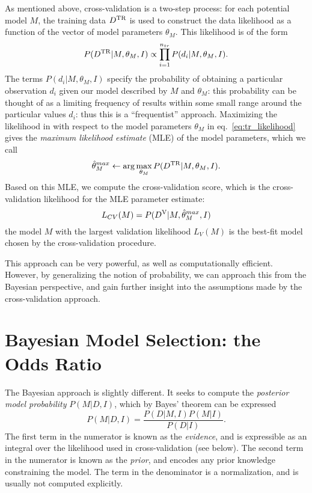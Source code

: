\documentclass[12pt]{article}
\newcommand{\Dtr}{\ensuremath{D^{\rm TR}}}
\newcommand{\Dva}{\ensuremath{D^{\rm V}}}
\newcommand{\eqn}[1]{eq.~\ref{eq:#1}}
\begin{document}
As mentioned above, cross-validation is a two-step process:
for each potential model $M$, the
training data \Dtr{} is used to construct the data likelihood as a function
of the vector of model parameters $\theta_M$.  This likelihood is of the form
\begin{equation}
  \label{eq:tr_likelihood}
  P(\Dtr|M, \theta_M, I) \propto \prod_{i=1}^{n_{tr}}P(d_i|M, \theta_M, I).
\end{equation}
The terms $P(d_i|M, \theta_M, I)$ specify the probability of obtaining a
particular observation $d_i$ given our model described by $M$ and $\theta_M$:
this probability can be thought of as a limiting frequency of results within
some small range around the particular values $d_i$: thus this is a
``frequentist'' approach.
Maximizing the likelihood in with respect to the model parameters $\theta_M$
in \eqn{tr_likelihood} gives the {\it maximum likelihood estimate} (MLE)
of the model parameters, which we call
\begin{equation}
  \hat{\theta}_M^{max} \leftarrow \arg\max_{\theta_M} P(\Dtr|M, \theta_M, I).
\end{equation}
Based on this MLE, we compute the cross-validation score, which is the
cross-validation likelihood for the MLE parameter estimate:
\begin{equation}
  L_{CV}(M) = P(\Dva|M, \hat{\theta}_M^{max}, I)
\end{equation}
the model $M$ with the largest validation likelihood $L_{V}(M)$ is the
best-fit model chosen by the cross-validation procedure.

This approach can be very powerful, as well as computationally efficient.
However, by generalizing the notion of probability, we can approach this
from the Bayesian perspective, and gain further insight into the assumptions
made by the cross-validation approach.

\section{Bayesian Model Selection: the Odds Ratio}
The Bayesian approach is slightly different.  It seeks to compute the
{\it posterior model probability} $P(M|D,I)$, which by Bayes' theorem
can be expressed
\begin{equation}
  \label{eq:bayes_theorem}
  P(M|D,I) = \frac{P(D|M,I)P(M|I)}{P(D|I)}.
\end{equation}
The first term in the numerator is known as the {\it evidence},
and is expressible as an integral over the likelihood used
in cross-validation (see below).
The second term in the numerator is known
as the {\it prior}, and encodes any prior knowledge constraining the model.
The term in the denominator is a normalization, and is usually not
computed explicitly.
\end{document}
